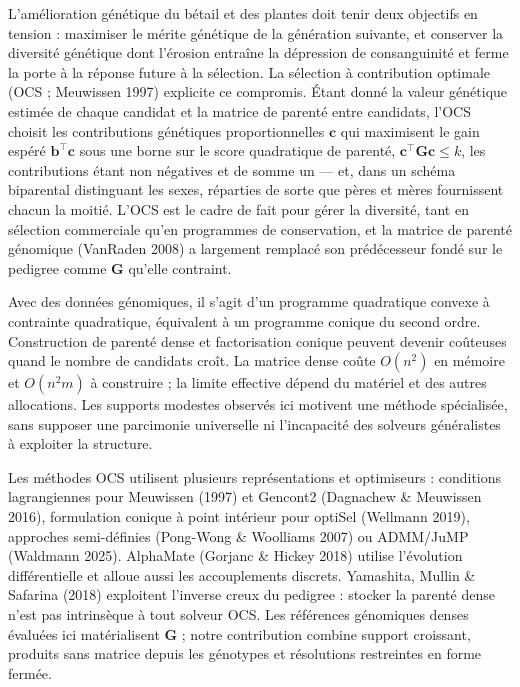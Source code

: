 \documentclass[11pt]{article}
\newcommand{\tp}{^{\top}}
\newcommand{\bc}{\mathbf{c}}
\newcommand{\bb}{\mathbf{b}}
\newcommand{\bG}{\mathbf{G}}
\begin{document}
L'amélioration génétique du bétail et des plantes doit tenir deux objectifs en tension : maximiser le mérite génétique de la génération suivante, et conserver la diversité génétique dont l'érosion entraîne la dépression de consanguinité et ferme la porte à la réponse future à la sélection. La sélection à contribution optimale (OCS ; Meuwissen 1997) explicite ce compromis. Étant donné la valeur génétique estimée de chaque candidat et la matrice de parenté entre candidats, l'OCS choisit les contributions génétiques proportionnelles $\bc$ qui maximisent le gain espéré $\bb\tp\bc$ sous une borne sur le score quadratique de parenté, $\bc\tp\bG\bc\le k$, les contributions étant non négatives et de somme un --- et, dans un schéma biparental distinguant les sexes, réparties de sorte que pères et mères fournissent chacun la moitié. L'OCS est le cadre de fait pour gérer la diversité, tant en sélection commerciale qu'en programmes de conservation, et la matrice de parenté génomique (VanRaden 2008) a largement remplacé son prédécesseur fondé sur le pedigree comme $\bG$ qu'elle contraint.

Avec des données génomiques, il s'agit d'un programme quadratique convexe à contrainte quadratique, équivalent à un programme conique du second ordre. Construction de parenté dense et factorisation conique peuvent devenir coûteuses quand le nombre de candidats croît. La matrice dense coûte $O(n^2)$ en mémoire et $O(n^2m)$ à construire ; la limite effective dépend du matériel et des autres allocations. Les supports modestes observés ici motivent une méthode spécialisée, sans supposer une parcimonie universelle ni l'incapacité des solveurs généralistes à exploiter la structure.

Les méthodes OCS utilisent plusieurs représentations et optimiseurs : conditions lagrangiennes pour Meuwissen (1997) et Gencont2 (Dagnachew \& Meuwissen 2016), formulation conique à point intérieur pour optiSel (Wellmann 2019), approches semi-définies (Pong-Wong \& Woolliams 2007) ou ADMM/JuMP (Waldmann 2025). AlphaMate (Gorjanc \& Hickey 2018) utilise l'évolution différentielle et alloue aussi les accouplements discrets. Yamashita, Mullin \& Safarina (2018) exploitent l'inverse creux du pedigree : stocker la parenté dense n'est pas intrinsèque à tout solveur OCS. Les références génomiques denses évaluées ici matérialisent $\bG$ ; notre contribution combine support croissant, produits sans matrice depuis les génotypes et résolutions restreintes en forme fermée.
\end{document}
